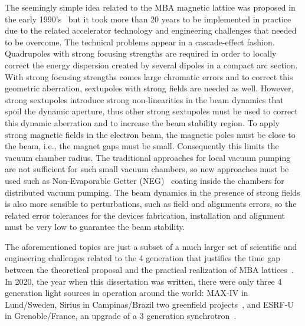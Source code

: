 The seemingly simple idea related to the MBA magnetic lattice was proposed in the early 1990's~\cite{einfeld1993} but it took more than 20 years to be implemented in practice due to the related accelerator technology and engineering challenges that needed to be overcome. The technical problems appear in a cascade-effect fashion. Quadrupoles with strong focusing strengths are required in order to locally correct the energy dispersion created by several dipoles in a compact arc section. With strong focusing strengths comes large chromatic errors and to correct this geometric aberration, sextupoles with strong fields are needed as well. However, strong sextupoles introduce strong non-linearities in the beam dynamics that spoil the dynamic aperture, thus other strong sextupoles must be used to correct this dynamic aberration and to increase the beam stability region. To apply strong magnetic fields in the electron beam, the magnetic poles must be close to the beam, i.e., the magnet gaps must be small. Consequently this limits the vacuum chamber radius. The traditional approaches for local vacuum pumping are not sufficient for such small vacuum chambers, so new approaches must be used such as Non-Evaporable Getter (NEG)~\cite{benvenuti} coating inside the chambers for distributed vacuum pumping. The beam dynamics in the presence of strong fields is also more sensible to perturbations, such as field and alignments errors, so the related error tolerances for the devices fabrication, installation and alignment must be very low to guarantee the beam stability. 

The aforementioned topics are just a subset of a much larger set of scientific and engineering challenges related to the 4 generation that justifies the time gap between the theoretical proposal and the practical realization of MBA lattices~\cite{hettel, neuenschwander}. In 2020, the year when this dissertation was written, there were only three 4 generation light sources in operation around the world: MAX-IV in Lund/Sweden, Sirius in Campinas/Brazil two greenfield projects~\cite{tavaresmaxiv, liu2014}, and ESRF-U in Grenoble/France, an upgrade of a 3 generation synchrotron~\cite{raimondi}.
